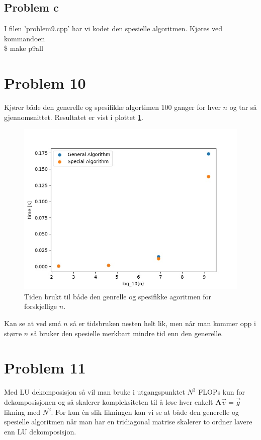\documentclass[english,notitlepage]{revtex4-1}  %
\begin{document}
\subsection*{Problem c}

I filen 'problem9.cpp' har vi kodet den spesielle algoritmen. Kjøres ved kommandoen \\

\$ make p9all



\section*{Problem 10}

Kjører både den generelle og spesifikke algortimen 100 ganger for hver $n$ og tar så gjennomsnittet. Resultatet er vist i plottet \ref{timeplot}.

\begin{figure}[ht]
\centering
\includegraphics[scale=0.65]{Images/plottime.jpg}
\caption{Tiden brukt til både den genrelle og spesifikke agoritmen for forskjellige $n$.}
\label{timeplot}
\end{figure}

Kan se at ved små $n$ så er tidsbruken nesten helt lik, men når man kommer opp i større $n$ så bruker den spesielle merkbart mindre tid enn den generelle.

\section*{Problem 11}

Med LU dekomposisjon så vil man bruke i utgangspunktet $N^3$ FLOPs kun for dekomposisjonen og så skalerer kompleksiteten til å løse hver enkelt $\textbf{A}\vec{v}= \vec{g}$ likning med $N^2$. For kun én slik likningen kan vi se at både den generelle og spesielle algoritmen når man har en tridiagonal matrise skalerer to ordner lavere enn LU dekomposisjon.
\end{document}
